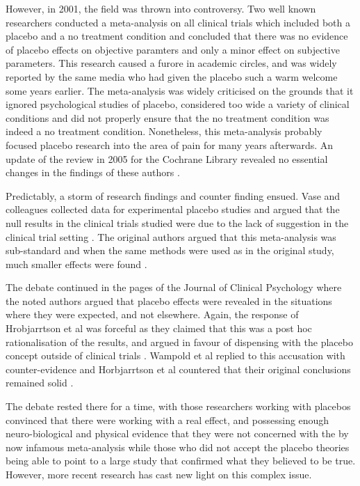 However, in 2001, the field was thrown into controversy. Two well known researchers conducted a meta-analysis on all clinical trials which included both a placebo and a no treatment condition \cite{hrobjartsson2001placebo}  and concluded that there was no evidence of placebo effects on objective paramters and only a minor effect on subjective parameters. This research caused a furore in academic circles, and was widely reported by the same media who had given the placebo such a warm welcome some years earlier. The meta-analysis was widely criticised \cite{Evans2003,Kirsch2001,Wickramasekera2001,Greene2001}  on the grounds that it ignored psychological studies of placebo, considered too wide a variety of clinical conditions and did not properly ensure that the no treatment condition was indeed a no treatment condition. Nonetheless, this meta-analysis probably focused placebo research into the area of pain for many years afterwards. An update of the review in 2005 for the Cochrane Library revealed no essential changes in the findings of these authors \cite{Hrobjartsson2004}. 

Predictably, a storm of research findings and counter finding ensued. Vase and colleagues collected data for experimental placebo studies and argued that the null results in the clinical trials studied were due to the lack of suggestion in the clinical trial setting \cite{Vase2002}.  The original authors argued that this meta-analysis was sub-standard and when the same methods were used as in the original study, much smaller effects were found \cite{Hrobjartsson2003}. 

The debate continued in the pages of the Journal of Clinical Psychology \cite{Wampold2005}  where the noted authors argued that placebo effects were revealed in the situations where they were expected, and not elsewhere. Again, the response of Hrobjarrtson et al was forceful as they claimed that this was a post hoc rationalisation of the results, and argued in favour of dispensing with the placebo concept outside of clinical trials \cite{Hrobjartsson2007a} . Wampold et al replied to this accusation \cite{Wampol2007}  with counter-evidence and Horbjarrtson et al countered that their original conclusions remained solid \cite{Hrobjartsson2007}. 

The debate rested there for a time, with those researchers working with placebos convinced that there were working with a real effect, and possessing enough neuro-biological and physical evidence that they were not concerned with the by now infamous meta-analysis while those who did not accept the placebo theories being able to point to a large study that confirmed what they believed to be true. However, more recent research has cast new light on this complex issue. 

